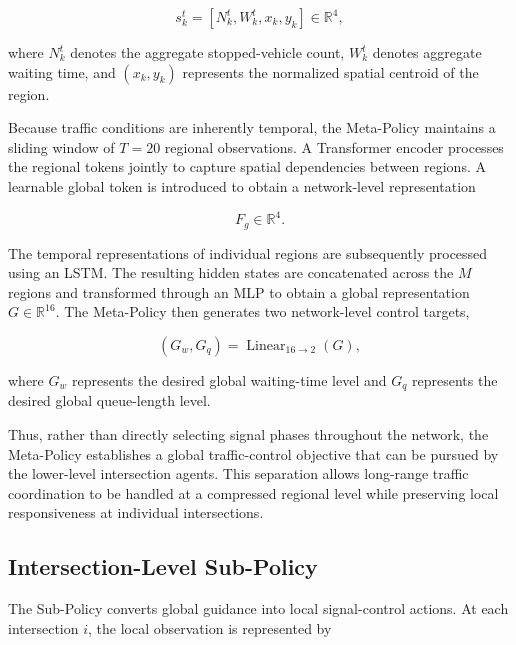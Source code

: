 \documentclass[3p,times]{elsarticle}
\theoremstyle{plain}
\theoremstyle{definition}
\begin{document}
\begin{equation}
s_k^t = \left[N_k^t, W_k^t, x_k, y_k\right] \in \mathbb{R}^{4},
\end{equation}

where $N_k^t$ denotes the aggregate stopped-vehicle count, $W_k^t$
denotes aggregate waiting time, and $(x_k, y_k)$ represents the
normalized spatial centroid of the region.

Because traffic conditions are inherently temporal, the Meta-Policy
maintains a sliding window of $T = 20$ regional observations. A
Transformer encoder processes the regional tokens jointly to capture
spatial dependencies between regions. A learnable global token is
introduced to obtain a network-level representation

\begin{equation}
F_g \in \mathbb{R}^{4}.
\end{equation}

The temporal representations of individual regions are subsequently
processed using an LSTM. The resulting hidden states are concatenated
across the $M$ regions and transformed through an MLP to obtain a
global representation $G \in \mathbb{R}^{16}$. The Meta-Policy then
generates two network-level control targets,

\begin{equation}
(G_w, G_q) = \operatorname{Linear}_{16\rightarrow2}(G),
\end{equation}

where $G_w$ represents the desired global waiting-time level and
$G_q$ represents the desired global queue-length level.

Thus, rather than directly selecting signal phases throughout the
network, the Meta-Policy establishes a global traffic-control
objective that can be pursued by the lower-level intersection agents.
This separation allows long-range traffic coordination to be handled
at a compressed regional level while preserving local responsiveness
at individual intersections.


\subsection{Intersection-Level Sub-Policy}\label{subsec3-7}

The Sub-Policy converts global guidance into local signal-control
actions. At each intersection $i$, the local observation is
represented by
\end{document}
